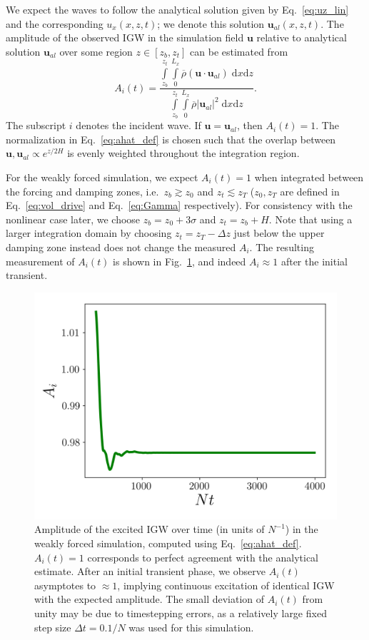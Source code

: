 \documentclass[
        fleqn,
        usenatbib,
        referee,
    ]{mnras}
\newcommand*{\abs}[1]{\left|#1\right|}
\newcommand*{\p}[1]{\left(#1\right)}
\newcommand*{\bm}[1]{\mathbf{#1}}
\begin{document}
We expect the waves to follow the analytical solution given by
Eq.~\eqref{eq:uz_lin} and the corresponding $u_x(x, z, t)$; we denote this
solution $\bm{u}_{al}(x, z, t)$. The amplitude of the observed IGW in the
simulation field $\bm{u}$ relative to analytical solution $\bm{u}_{al}$ over
some region $z \in [z_b, z_t]$ can be estimated from
\begin{equation}
    A_i(t) = \frac{\int\limits_{z_b}^{z_t}\int\limits_0^{L_x}
        \overline{\rho}\p{\bm{u} \cdot \bm{u}_{al}}\;\mathrm{d}x\mathrm{d}z}
        {\int\limits_{z_b}^{z_t}\int\limits_0^{L_x}
        \overline{\rho}\abs{\bm{u}_{al}}^2\;\mathrm{d}x\mathrm{d}z}.
        \label{eq:ahat_def}
\end{equation}
The subscript $i$ denotes the incident wave. If $\bm{u} = \bm{u}_{al}$, then
$A_i(t) = 1$. The normalization in Eq.~\eqref{eq:ahat_def} is chosen such that
the overlap between $\bm{u}, \bm{u}_{al} \propto e^{z/2H}$ is evenly weighted
throughout the integration region.

For the weakly forced simulation, we expect
$A_i(t) = 1$ when integrated between the forcing and damping zones, i.e.\
$z_b \gtrsim z_0$ and $z_t \lesssim z_T$ ($z_0, z_T$ are defined in
Eq.~\eqref{eq:vol_drive} and Eq.~\eqref{eq:Gamma} respectively). For consistency
with the nonlinear case later, we choose $z_b = z_0 + 3\sigma$ and $z_t = z_b +
H$. Note that using a larger integration domain by choosing $z_t = z_T - \Delta
z$ just below the upper damping zone instead does not change the measured $A_i$.
The resulting measurement of $A_i(t)$ is shown in Fig.~\ref{fig:lin_amps}, and
indeed $A_i \approx 1$ after the initial transient.
\begin{figure}
    \centering
    \includegraphics[width=0.9\columnwidth]{plots/lin_amps.png}
    \caption{Amplitude of the excited IGW over time (in units of $N^{-1}$) in
    the weakly forced simulation, computed using Eq.~\eqref{eq:ahat_def}.
    $A_i(t) = 1$ corresponds to perfect agreement with the analytical estimate.
    After an initial transient phase, we observe $A_i(t)$ asymptotes to $\approx
    1$, implying continuous excitation of identical IGW with the expected
    amplitude. The small deviation of $A_i(t)$ from unity may be due to
    timestepping errors, as a relatively large fixed step size $\Delta t =
    0.1/N$ was used for this simulation.}\label{fig:lin_amps}
\end{figure}
\end{document}
